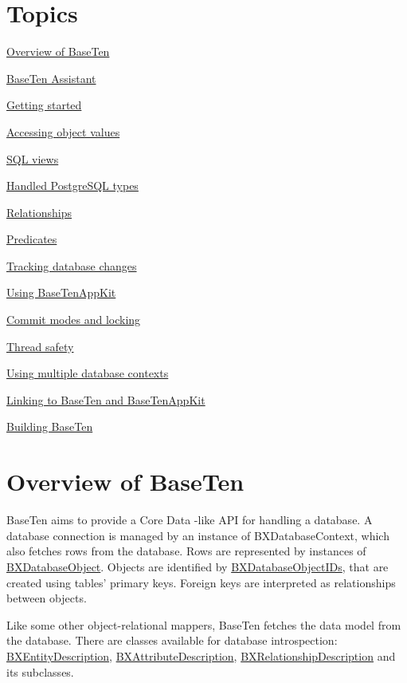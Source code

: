 \section*{Topics}  \begin{DoxyItemize}
\item \hyperlink{overview}{Overview of Base\+Ten} \item \hyperlink{baseten_assistant}{Base\+Ten Assistant} \item \hyperlink{getting_started}{Getting started} \item \hyperlink{accessing_values}{Accessing object values} \item \hyperlink{sql_views}{S\+Q\+L views} \item \hyperlink{database_types}{Handled Postgre\+S\+Q\+L types} \item \hyperlink{relationships}{Relationships} \item \hyperlink{predicates}{Predicates} \item \hyperlink{tracking_changes}{Tracking database changes} \item \hyperlink{using_appkit_classes}{Using Base\+Ten\+App\+Kit} \item \hyperlink{autocommit_manual_commit}{Commit modes and locking} \item \hyperlink{thread_safety}{Thread safety} \item \hyperlink{multiple_contexts}{Using multiple database contexts} \item \hyperlink{linking_to_baseten}{Linking to Base\+Ten and Base\+Ten\+App\+Kit} \item \hyperlink{building_baseten}{Building Base\+Ten} \end{DoxyItemize}
\hypertarget{overview}{}\section{Overview of Base\+Ten}\label{overview}
Base\+Ten aims to provide a Core Data -\/like A\+P\+I for handling a database. A database connection is managed by an instance of B\+X\+Database\+Context, which also fetches rows from the database. Rows are represented by instances of \hyperlink{interface_b_x_database_object}{B\+X\+Database\+Object}. Objects are identified by \hyperlink{interface_b_x_database_object_i_d}{B\+X\+Database\+Object\+I\+Ds}, that are created using tables' primary keys. Foreign keys are interpreted as relationships between objects.

Like some other object-\/relational mappers, Base\+Ten fetches the data model from the database. There are classes available for database introspection\+: \hyperlink{interface_b_x_entity_description}{B\+X\+Entity\+Description}, \hyperlink{interface_b_x_attribute_description}{B\+X\+Attribute\+Description}, \hyperlink{interface_b_x_relationship_description}{B\+X\+Relationship\+Description} and its subclasses.

